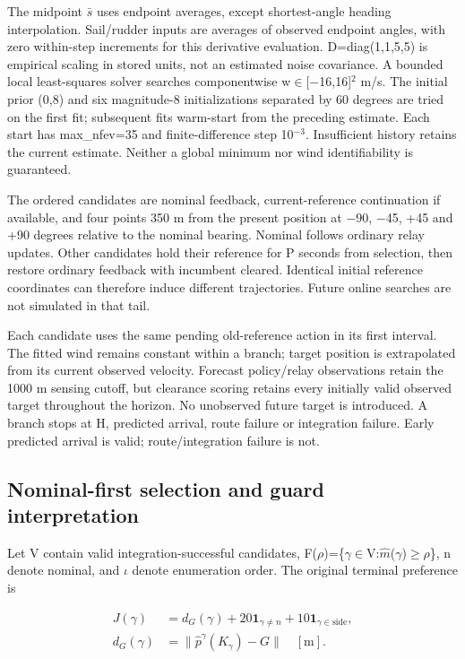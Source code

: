 \documentclass[conference]{IEEEtran}
\begin{document}
The midpoint $\bar s$ uses endpoint averages, except shortest-angle heading interpolation. Sail/rudder inputs are averages of observed endpoint angles, with zero within-step increments for this derivative evaluation. D=diag(1,1,5,5) is empirical scaling in stored units, not an estimated noise covariance. A bounded local least-squares solver searches componentwise w\ensuremath{\in}[\ensuremath{-}16,16]\ensuremath{^2} m/s. The initial prior (0,8) and six magnitude-8 initializations separated by 60 degrees are tried on the first fit; subsequent fits warm-start from the preceding estimate. Each start has max\_nfev=35 and finite-difference step 10$^{-3}$. Insufficient history retains the current estimate. Neither a global minimum nor wind identifiability is guaranteed.

The ordered candidates are nominal feedback, current-reference continuation if available, and four points 350 m from the present position at \ensuremath{-}90, \ensuremath{-}45, +45 and +90 degrees relative to the nominal bearing. Nominal follows ordinary relay updates. Other candidates hold their reference for P seconds from selection, then restore ordinary feedback with incumbent cleared. Identical initial reference coordinates can therefore induce different trajectories. Future online searches are not simulated in that tail.

Each candidate uses the same pending old-reference action in its first interval. The fitted wind remains constant within a branch; target position is extrapolated from its current observed velocity. Forecast policy/relay observations retain the 1000 m sensing cutoff, but clearance scoring retains every initially valid observed target throughout the horizon. No unobserved future target is introduced. A branch stops at H, predicted arrival, route failure or integration failure. Early predicted arrival is valid; route/integration failure is not.

\subsection{Nominal-first selection and guard interpretation}

Let V contain valid integration-successful candidates, F(\ensuremath{\rho})=\{\ensuremath{\gamma}\ensuremath{\in}V:$\hat m$(\ensuremath{\gamma})\ensuremath{\ge}\ensuremath{\rho}\}, n denote nominal, and \ensuremath{\iota} denote enumeration order. The original terminal preference is

\begin{equation}\label{eq:3}
\begin{aligned}J(\gamma)&=d_G(\gamma)+20\mathbf{1}_{\gamma\ne n}+10\mathbf{1}_{\gamma\in\mathrm{side}},\\d_G(\gamma)&=\|\hat p^\gamma(K_\gamma)-G\|\quad[\mathrm m].\end{aligned}
\end{equation}
\end{document}
